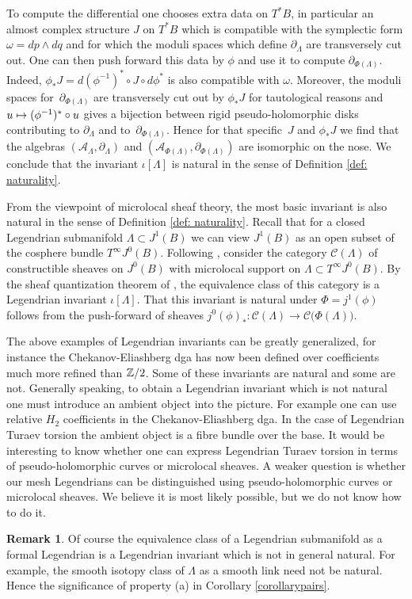 \documentclass[11pt]{article}
\numberwithin{equation}{section}\providecommand{\dpl}{\displaystyle}
\let\mathcal\mathscr
\newcommand\mto{\mathchoice{\longmapsto}{\mapsto}{\mapsto}{\mapsto}}
\theoremstyle{plain}
\theoremstyle{definition}
\newtheorem{remark}[theorem]{Remark}
\newcommand{\cA}{\mathcal{A}}\newcommand{\cB}{\mathcal{B}}
\newcommand{\cC}{\mathcal{C}}\newcommand{\cD}{\mathcal{D}}
\begin{document}
To compute the differential one chooses extra data on $T^*B$, in particular an almost complex structure $J$ on $T^*B$ which is compatible with the symplectic form $\omega=dp \wedge dq$ and for which the moduli spaces which define $\partial_\Lambda$ are transversely cut out. One can then push forward this data by $\phi$ and use it to compute $\partial_{\Phi(\Lambda)}$. Indeed, $\phi_* J=d(\phi^{-1})^* \circ J \circ d \phi^*$ is also compatible with $\omega$. Moreover, the moduli spaces for~$\partial_{\Phi(\Lambda)}$ are transversely cut out by $\phi_*J$ for tautological reasons and $u \mto (\phi^{-1})^* \circ u$ gives a bijection between rigid pseudo-holomorphic disks contributing to $\partial_\Lambda$ and to~$\partial_{\Phi(\Lambda)}$. Hence for that specific~$J$ and $\phi_*J$ we find that the algebras $(\cA_\Lambda, \partial_\Lambda)$ and $(\cA_{\Phi(\Lambda)}, \partial_{\Phi(\Lambda)})$ are isomorphic on the nose. We conclude that the invariant $\iota[\Lambda]$ is natural in the sense of Definition \ref{def: naturality}.

From the viewpoint of microlocal sheaf theory, the most basic invariant is also natural in the sense of Definition \ref{def: naturality}. Recall that for a closed Legendrian submanifold $\Lambda \subset J^1(B)$ we can view $J^1(B)$ as an open subset of the cosphere bundle $T^\infty J^0(B)$. Following \cite{STZ17}, consider the category $\cC(\Lambda)$ of constructible sheaves on $J^0(B)$ with microlocal support on $\Lambda \subset T^\infty J^0(B)$. By the sheaf quantization theorem of \cite{GKS12}, the equivalence class of this category is a Legendrian invariant $\iota[\Lambda]$. That this invariant is natural under $\Phi=j^1(\phi)$ follows from the push-forward of sheaves $j^0(\phi)_*: \cC(\Lambda) \to \cC\big(\Phi(\Lambda)\big)$.

The above examples of Legendrian invariants can be greatly generalized, for instance the Chekanov-Eliashberg dga has now been defined over coefficients much more refined than $\mathbb{Z}/2$. Some of these invariants are natural and some are not. Generally speaking, to obtain a Legendrian invariant which is not natural one must introduce an ambient object into the picture. For example one can use relative $H_2$ coefficients in the Chekanov-Eliashberg dga. In the case of Legendrian Turaev torsion the ambient object is a fibre bundle over the base. It would be interesting to know whether one can express Legendrian Turaev torsion in terms of pseudo-holomorphic curves or microlocal sheaves. A weaker question is whether our mesh Legendrians can be distinguished using pseudo-holomorphic curves or microlocal sheaves. We believe it is most likely possible, but we do not know how to do it.
\begin{remark}
Of course the equivalence class of a Legendrian submanifold as a formal Legendrian is a Legendrian invariant which is not in general natural. For example, the smooth isotopy class of $\Lambda$ as a smooth link need not be natural. Hence the significance of property (a) in Corollary \ref{corollarypairs}.
\end{remark}
\end{document}
